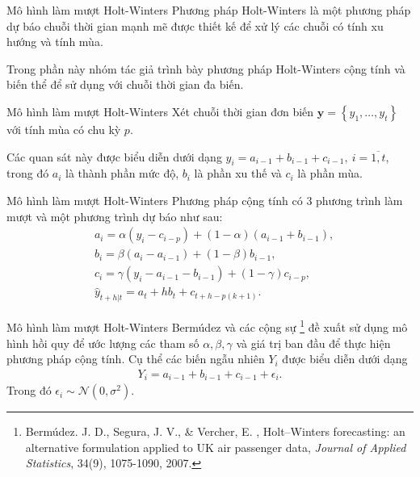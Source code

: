 \begin{frame}{Mô hình làm mượt Holt-Winters}
    Phương pháp Holt-Winters là một phương pháp dự báo chuỗi thời gian
mạnh mẽ được thiết kế để xử lý các chuỗi có tính xu hướng và tính mùa.

Trong phần này nhóm tác giả trình bày phương pháp Holt-Winters cộng tính và biến thể để sử dụng với chuỗi thời gian đa biến. 
\end{frame}

\begin{frame}{Mô hình làm mượt Holt-Winters}
       Xét chuỗi thời gian đơn biến $\textbf{y} = \left\{y_1, \dots, y_t\right\}$ với tính mùa có chu kỳ $p$. 
       
       Các quan sát này được biểu diễn dưới dạng $y_i = a_{i-1} + b_{i-1} + c_{i-1}, \ i= \overline{1, t}$, trong đó $a_i$ là thành phần mức độ, $b_i$ là phần xu thế và $c_i$ là phần mùa.
\end{frame}

\begin{frame}{Mô hình làm mượt Holt-Winters}
    Phương pháp cộng tính có $3$ phương trình làm mượt và một phương trình dự báo như sau:
    \begin{align} 
        &a_i = \alpha\left(y_i - c_{i-p}\right) + \left(1-\alpha\right)\left(a_{i-1} + b_{i-1}\right),\label{eq:3.1} \\
        &b_i = \beta\left(a_i - a_{i-1}\right) + \left(1 - \beta\right)b_{i-1}, \label{eq:3.2}\\
        &c_i = \gamma\left(y_i - a_{i-1} - b_{i-1}\right) + \left(1-\gamma\right)c_{i-p},\label{eq:3.3} \\
        &\hat{y}_{t+h \vert t} = a_t + h b_t + c_{t+h - p\left(k+1\right)}. \label{eq:3.4}
    \end{align}
    
\end{frame}

\begin{frame}{Mô hình làm mượt Holt-Winters}
    Bermúdez và các cộng sự \footnote{Bermúdez. J. D., Segura, J. V., \& Vercher, E. , Holt–Winters forecasting: an alternative formulation applied to UK air passenger data, \textit{Journal of Applied Statistics}, 34(9), 1075-1090, 2007.} đề xuất sử dụng mô hình hồi quy để ước lượng các tham số $\alpha, \beta, \gamma$ và giá trị ban đầu để thực hiện phương pháp cộng tính. Cụ thể các biến ngẫu nhiên $Y_i$ được biểu diễn dưới dạng
    \begin{align}
        Y_i = a_{i-1} + b_{i-1} + c_{i-1} +  \epsilon_i. \label{eq:3.5}
    \end{align}
    Trong đó $\epsilon_i \sim \mathcal{N}\left(0, \sigma^2\right)$.
\end{frame}


